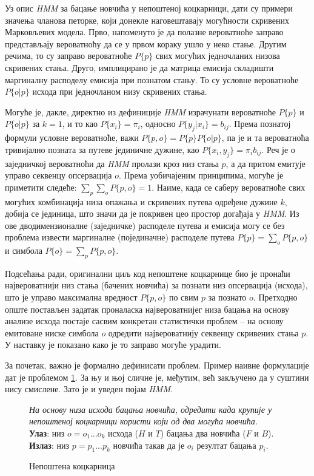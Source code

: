\documentclass[12pt,oneside]{memoir}
\newenvironment{problem}[1][!ht]
{\renewcommand{\algorithmcfname}{Проблем}
\begin{figure}[!ht]
\centering
  \begin{minipage}{.94\linewidth}
	\begin{algorithm}[#1]%
  }{\end{algorithm}
  \end{minipage}
\end{figure}}
\begin{document}
\begin{CJK}{UTF8}{ipxm}
Уз опис \textit{HMM} за бацање новчића у непоштеној коцкарници, дати су примери значења чланова петорке, који донекле наговештавају могућности скривених Марковљевих модела. Прво, напоменуто је да полазне вероватноће заправо представљају вероватноћу да се у првом кораку ушло у неко стање. Другим речима, то су заправо вероватноће $P\{p\}$ свих могућих једночланих низова скривених стања. Друго, имплицирано је да матрица емисија складишти маргиналну расподелу емисија при познатом стању. То су условне вероватноће $P\{o | p\}$ исхода при једночланом низу скривених стања.

Могуће је, дакле, директно из дефиниције \textit{HMM} израчунати вероватноће  $P\{p\}$ и $P\{o | p\}$ за $k = 1$, и то као $P\{x_i\} = \pi_i$, односно $P\{y_j | x_i\} = b_{ij}$. Према познатој формули условне вероватноће, важи $P\{p, o\} = P\{p\} P\{o | p\}$, па је и та вероватноћа тривијално позната за путеве јединичне дужине, као $P\{x_i, y_j\} = \pi_i b_{ij}$. Реч је о заједничкој вероватноћи да \textit{HMM} пролази кроз низ стања $p$, а да притом емитује управо секвенцу опсервација $o$. Према уобичајеним принципима, могуће је приметити следеће: $\sum_p \sum_o P\{p, o\} = 1$. Наиме, када се саберу вероватноће свих могућих комбинација низа опажања и скривених путева одређене дужине $k$, добија се јединица, што значи да је покривен цео простор догађаја у \textit{HMM}. Из ове дводимензионалне (заједничке) расподеле путева и емисија могу се без проблема извести маргиналне (појединачне) расподеле путева $P\{p\} = \sum_o P\{p, o\}$ и симбола $P\{o\} = \sum_p P\{p, o\}$.

Подсећања ради, оригинални циљ код непоштене коцкарнице био је пронаћи највероватнији низ стања (бачених новчића) за познати низ опсервација (исхода), што је управо максимална вредност $P\{p, o\}$ по свим $p$ за познато $o$. Претходно опште постављен задатак проналаска највероватнијег низа бацања на основу анализе исхода постаје сасвим конкретан статистички проблем -- на основу емитоване ниске симбола $o$ одредити највероватнију секвенцу скривених стања $p$. У наставку је показано како је то заправо могуће урадити.

За почетак, важно је формално дефинисати проблем. Пример наивне формулације дат је проблемом \ref{prob:kock}. За њу и њој сличне је, међутим, већ закључено да у суштини нису смислене. Зато је и уведен појам \textit{HMM}.

\begin{problem}[H]
  \SetAlgoLined
  \textit{На основу низа исхода бацања новчића, одредити када крупије у непоштеној коцкарници користи који од два могућа новчића.}\\
  \textbf{Улаз}: низ $o = o_1...o_k$ исхода ($H$ и $T$) бацања два новчића ($F$ и $B$).\\
  \textbf{Излаз}: низ $p = p_1...p_k$ новчића такав да је $o_i$ резултат бацања $p_i$.
  \caption{Непоштена коцкарница}
  \label{prob:kock}
\end{problem}


\end{CJK}
\end{document}
